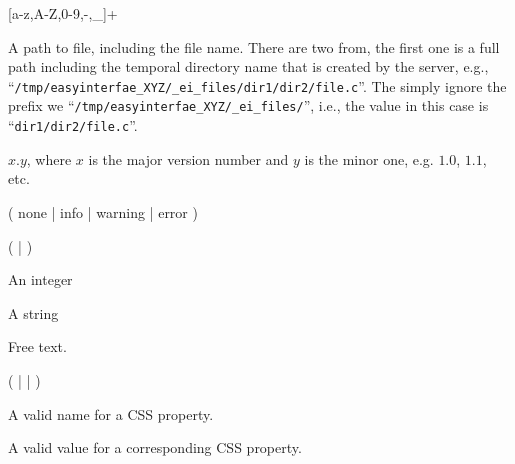 \bigskip
\noindent
{}

 [a-z,A-Z,0-9,-,\_]+

\bigskip
\noindent
{}

\noindent
A path to file, including the file name. There are two from, the first
one is a full path including the temporal directory name that is
created by the server, e.g.,
``\texttt{/tmp/easyinterfae\_XYZ/\_ei\_files/dir1/dir2/file.c}''. The
simply ignore the prefix we
``\texttt{/tmp/easyinterfae\_XYZ/\_ei\_files/}'', i.e., the value in
this case is ``\texttt{dir1/dir2/file.c}''.

\bigskip
\noindent
{}

$x.y$, where $x$ is the major version number and $y$ is the minor one,
e.g. $1.0$, $1.1$, etc.

\bigskip
\noindent
{}

( none | info | warning | error )

\bigskip
\noindent
{}

(  |  )

\bigskip
\noindent
{}

An integer

\bigskip
\noindent
{}

A string

\bigskip
\noindent
{}

Free text.

\bigskip
\noindent
{}

(  |  | )

\bigskip
\noindent
{}

A valid name for a CSS property.

\bigskip
\noindent
{}

A valid value for a corresponding CSS property.



